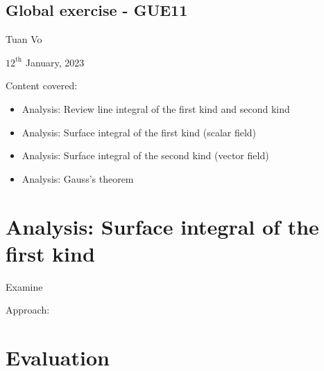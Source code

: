 \documentclass[12pt]{article}
\begin{document}
\begin{center}
	\section*{Global exercise - GUE11}
\end{center}
\begin{center}
	Tuan Vo
\end{center}
\begin{center}
	$12^{\text{th}}$ January, 2023
\end{center}
Content covered:
\begin{itemize}
	\item[\checkmark] Analysis: Review line integral of the first kind and second kind
	\item[\checkmark] Analysis: Surface integral of the first kind (scalar field)
	\item[\checkmark] Analysis: Surface integral of the second kind (vector field)
	\item[\checkmark] Analysis: Gauss's theorem
\end{itemize}
\section{Analysis: Surface integral of the first kind}
\begin{exampleboxed}
	Examine
\end{exampleboxed}
Approach:
\clearpage
\section{Evaluation}


% 
\end{document}

